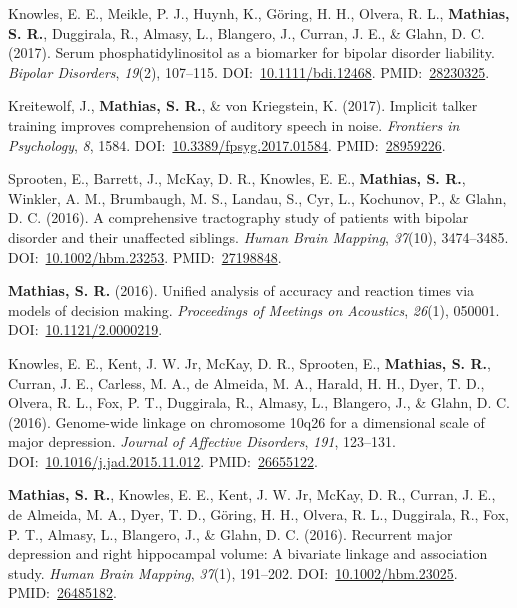 \documentclass[10pt]{article}
\makeatletter
\newlength{\bibhang}
\newlength{\bibsep}
 {\@listi \global\bibsep\itemsep \global\advance\bibsep by\parsep}
\newenvironment{bibsection}%
        {\vspace{-\baselineskip}\begin{list}{}{%
       \setlength{\leftmargin}{\bibhang}%
       \setlength{\itemindent}{-\leftmargin}%
       \setlength{\itemsep}{\bibsep}%
       \setlength{\parsep}{\z@}%
        \setlength{\partopsep}{0pt}%
        \setlength{\topsep}{0pt}}}
        {\end{list}\vspace{-.6\baselineskip}}
\makeatother
\begin{document}
\begin{bibsection}
\item Knowles, E. E., Meikle, P. J., Huynh, K., Göring, H. H., Olvera, R. L., \textbf{Mathias, S. R.}, Duggirala, R., Almasy, L., Blangero, J., Curran, J. E., \& Glahn, D. C. (2017). Serum phosphatidylinositol as a biomarker for bipolar disorder liability. \emph{Bipolar Disorders}, \emph{19}(2), 107--115. DOI:~\href{https://doi.org/10.1111/bdi.12468}{10.1111/bdi.12468}. PMID:~\href{https://www.ncbi.nlm.nih.gov/pubmed/?term=28230325}{28230325}.
\item Kreitewolf, J., \textbf{Mathias, S. R.}, \& von Kriegstein, K. (2017). Implicit talker training improves comprehension of auditory speech in noise. \emph{Frontiers in Psychology}, \emph{8}, 1584. DOI:~\href{https://doi.org/10.3389/fpsyg.2017.01584}{10.3389/fpsyg.2017.01584}. PMID:~\href{https://www.ncbi.nlm.nih.gov/pubmed/?term=28959226}{28959226}.
\item Sprooten, E., Barrett, J., McKay, D. R., Knowles, E. E., \textbf{Mathias, S. R.}, Winkler, A. M., Brumbaugh, M. S., Landau, S., Cyr, L., Kochunov, P., \& Glahn, D. C. (2016). A comprehensive tractography study of patients with bipolar disorder and their unaffected siblings. \emph{Human Brain Mapping}, \emph{37}(10), 3474--3485. DOI:~\href{https://doi.org/10.1002/hbm.23253}{10.1002/hbm.23253}. PMID:~\href{https://www.ncbi.nlm.nih.gov/pubmed/?term=27198848}{27198848}.
\item \textbf{Mathias, S. R.} (2016). Unified analysis of accuracy and reaction times via models of decision making. \emph{Proceedings of Meetings on Acoustics}, \emph{26}(1), 050001. DOI:~\href{https://doi.org/10.1121/2.0000219}{10.1121/2.0000219}.
\item Knowles, E. E., Kent, J. W. Jr, McKay, D. R., Sprooten, E., \textbf{Mathias, S. R.}, Curran, J. E., Carless, M. A., de Almeida, M. A., Harald, H. H., Dyer, T. D., Olvera, R. L., Fox, P. T., Duggirala, R., Almasy, L., Blangero, J., \& Glahn, D. C. (2016). Genome-wide linkage on chromosome 10q26 for a dimensional scale of major depression. \emph{Journal of Affective Disorders}, \emph{191}, 123--131. DOI:~\href{https://doi.org/10.1016/j.jad.2015.11.012}{10.1016/j.jad.2015.11.012}. PMID:~\href{https://www.ncbi.nlm.nih.gov/pubmed/?term=26655122}{26655122}.
\item \textbf{Mathias, S. R.}, Knowles, E. E., Kent, J. W. Jr, McKay, D. R., Curran, J. E., de Almeida, M. A., Dyer, T. D., Göring, H. H., Olvera, R. L., Duggirala, R., Fox, P. T., Almasy, L., Blangero, J., \& Glahn, D. C. (2016). Recurrent major depression and right hippocampal volume: A bivariate linkage and association study. \emph{Human Brain Mapping}, \emph{37}(1), 191--202. DOI:~\href{https://doi.org/10.1002/hbm.23025}{10.1002/hbm.23025}. PMID:~\href{https://www.ncbi.nlm.nih.gov/pubmed/?term=26485182}{26485182}.

\end{bibsection}
\end{document}
